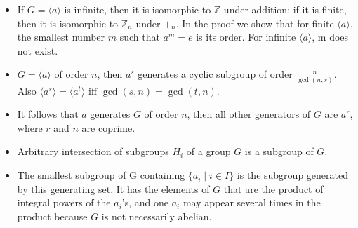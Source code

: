 \documentclass{article}
\newcommand{\Z}{\mathbb{Z}}
\begin{document}
\begin{itemize}
    \item If $G = \langle a \rangle$ is infinite, then it is isomorphic to $\Z$ under addition; if it is finite, then it is isomorphic to $\Z_n$ under $+_n$. In the proof we show that for finite $\langle a \rangle$, the smallest number $m$ such that $a^m = e$ is its order. For infinite $\langle a \rangle$, m does not exist.
    \item $G = \langle a \rangle$ of order $n$, then $a^s$ generates a cyclic subgroup of order $\frac{n}{\gcd(n,s)}$. Also $\langle a^s \rangle = \langle a^t \rangle$ iff $\gcd(s,n)=\gcd(t,n)$.
    \item It follows that $a$ generates $G$ of order $n$, then all other generators of $G$ are $a^r$, where $r$ and $n$ are coprime.
    \item Arbitrary intersection of subgroups $H_i$ of a group $G$ is a subgroup of $G$.
    \item The smallest subgroup of G containing $\{a_i \mid i \in I\}$ is the subgroup generated by this generating set. It has the elements of $G$ that are the product of integral powers of the $a_i$'s, and one $a_i$ may appear several times in the product because $G$ is not necessarily abelian.
\end{itemize}
\end{document}
